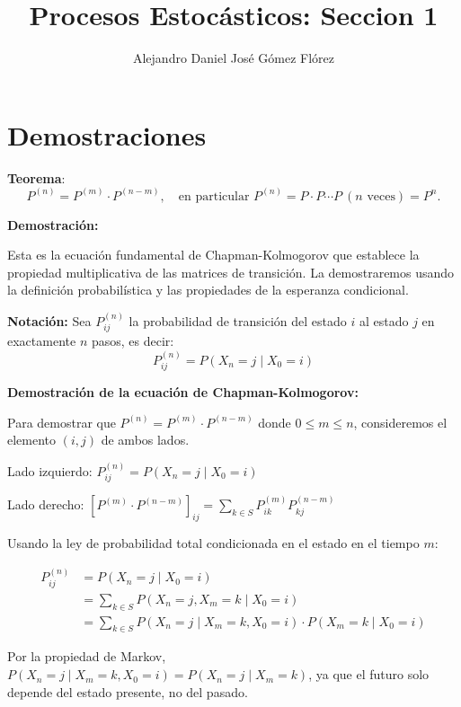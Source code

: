 \documentclass[12pt,a4paper]{article}
\title{Procesos Estocásticos: Seccion 1}
\author{Alejandro Daniel José Gómez Flórez}
\date{}
\newcommand{\teorema}[1]{%
\begin{teoremabox}
\textbf{Teorema}: #1
\end{teoremabox}
}
\begin{document}
\maketitle

\section{Demostraciones}


\teorema{
\begin{equation*}
P^{(n)} = P^{(m)} \cdot P^{(n-m)}, \quad \text{en particular } P^{(n)} = P \cdot P \cdots P \ (\text{$n$ veces}) = P^n.
\end{equation*}}

\textbf{Demostración:}

Esta es la ecuación fundamental de Chapman-Kolmogorov que establece la propiedad multiplicativa de las matrices de transición. La demostraremos usando la definición probabilística y las propiedades de la esperanza condicional.

\textbf{Notación:} Sea $P_{ij}^{(n)}$ la probabilidad de transición del estado $i$ al estado $j$ en exactamente $n$ pasos, es decir:
\begin{equation*}
P_{ij}^{(n)} = P(X_n = j \mid X_0 = i)
\end{equation*}

\textbf{Demostración de la ecuación de Chapman-Kolmogorov:}

Para demostrar que $P^{(n)} = P^{(m)} \cdot P^{(n-m)}$ donde $0 \leq m \leq n$, consideremos el elemento $(i,j)$ de ambos lados.

Lado izquierdo: $P_{ij}^{(n)} = P(X_n = j \mid X_0 = i)$

Lado derecho: $[P^{(m)} \cdot P^{(n-m)}]_{ij} = \sum_{k \in S} P_{ik}^{(m)} P_{kj}^{(n-m)}$

Usando la ley de probabilidad total condicionada en el estado en el tiempo $m$:

\begin{align*}
P_{ij}^{(n)} &= P(X_n = j \mid X_0 = i) \\
&= \sum_{k \in S} P(X_n = j, X_m = k \mid X_0 = i) \\
&= \sum_{k \in S} P(X_n = j \mid X_m = k, X_0 = i) \cdot P(X_m = k \mid X_0 = i)
\end{align*}

Por la propiedad de Markov, $P(X_n = j \mid X_m = k, X_0 = i) = P(X_n = j \mid X_m = k)$, ya que el futuro solo depende del estado presente, no del pasado.
\end{document}

